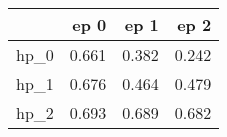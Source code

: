 \begin{tabular}{lrrr}
\toprule
{} &   ep 0 &   ep 1 &   ep 2 \\
\midrule
hp\_0 &  0.661 &  0.382 &  0.242 \\
hp\_1 &  0.676 &  0.464 &  0.479 \\
hp\_2 &  0.693 &  0.689 &  0.682 \\
\bottomrule
\end{tabular}
